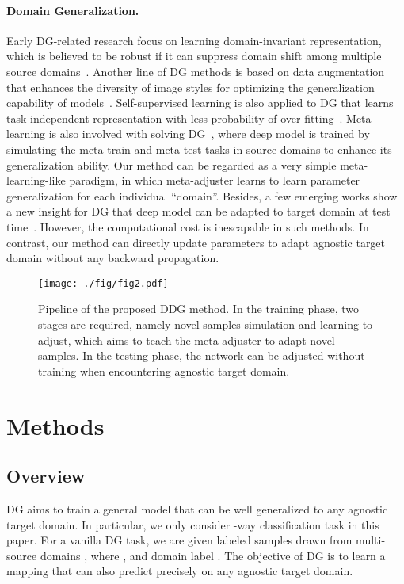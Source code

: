 \documentclass{article}
\begin{document}
\paragraph{Domain Generalization.}
Early DG-related research focus on learning domain-invariant representation, which is believed to be robust if it can suppress domain shift among multiple source domains~\cite{motiian2017unifiedDG}. Another line of DG methods is based on data augmentation that enhances the diversity of image styles for optimizing the generalization capability of models~\cite{ddaig,mixstyle}. Self-supervised learning is also applied to DG that learns task-independent representation with less probability of over-fitting~\cite{carlucci2019JiGen,kim2021selfreg}. Meta-learning is also involved with solving DG~\cite{balaji2018metareg}, where deep model is trained by simulating the meta-train and meta-test tasks in source domains to enhance its generalization ability. Our method can be regarded as a very simple meta-learning-like paradigm, in which meta-adjuster learns to learn parameter generalization for each individual ``domain''. 
Besides, a few emerging works show a new insight for DG that deep model can be adapted to target domain at test time~\cite{iwasawa2021test}. However, the computational cost is inescapable in such methods. In contrast, our method can directly update parameters to adapt agnostic target domain without any backward propagation.



\begin{figure}[t]
     \centering
     \footnotesize
     \texttt{[image: ./fig/fig2.pdf]}
     \vspace{-0.2cm}
     \caption{Pipeline of the proposed DDG method. In the training phase, two stages are required, namely novel samples simulation and learning to adjust, which aims to teach the meta-adjuster to adapt novel samples. In the testing phase, the network can be adjusted without training when encountering agnostic target domain.}
     \label{fig:pipeline}
     \vspace{-0.2cm}
\end{figure}


\section{Methods}

\subsection{Overview}
DG aims to train a general model that can be well generalized to any agnostic target domain. In particular, we only consider -way classification task in this paper. For a vanilla DG task, we are given  labeled samples  drawn from multi-source domains , where ,  and domain label . The objective of DG is to learn a mapping  that can also predict precisely on any agnostic target domain. 
\end{document}
